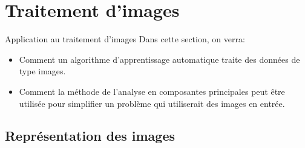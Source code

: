 \section[Traitement d'images]{Traitement d'images}

\begin{frame}{Application au traitement d'images}
	Dans cette section, on verra:
	\begin{itemize}
		\item Comment un algorithme d'apprentissage automatique traite des données de type images.
		\item Comment la méthode de l'analyse en composantes principales peut être utilisée pour simplifier un problème qui utiliserait des images en entrée.
	\end{itemize}
\end{frame}

\subsection[Représentation des images]{Représentation des images}

